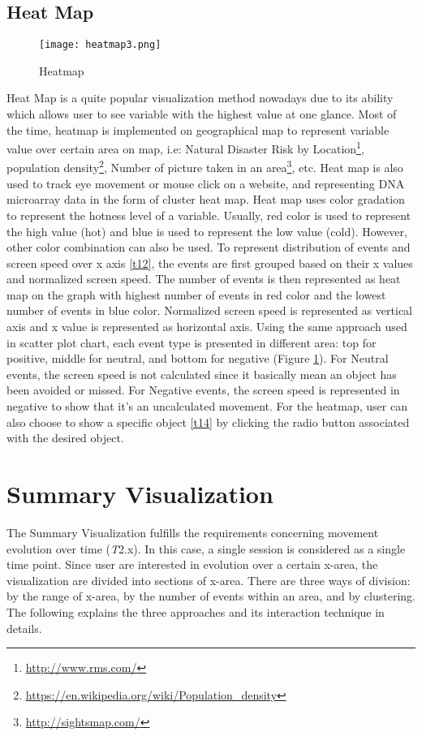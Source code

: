 \subsection{Heat Map}
\begin{figure}
\centering
\texttt{[image: heatmap3.png]}
\caption{Heatmap}
\label{heatmap}
\end{figure}
Heat Map is a quite popular visualization method nowadays due to its ability which allows user to see variable with the highest value at one glance. Most of the time, heatmap is implemented on geographical map to represent variable value over certain area on map, i.e: Natural Disaster Risk by Location\footnote{\url{http://www.rms.com/}}, population density\footnote{\url{https://en.wikipedia.org/wiki/Population_density}}, Number of picture taken in an area\footnote{\url{http://sightsmap.com/}}, etc. Heat map is also used to track eye movement or mouse click on a website, and representing DNA microarray data in the form of cluster heat map\cite{friendly}. Heat map uses color gradation to represent the hotness level of a variable. Usually, red color is used to represent the high value (hot) and blue is used to represent the low value (cold). However, other color combination can also be used. To represent distribution of events and screen speed over x axis \ref{t12}, the events are first grouped based on their x values and normalized screen speed. The number of events is then represented as heat map on the graph with highest number of events in red color and the lowest number of events in blue color. Normalized screen speed is represented as vertical axis and x value is represented as horizontal axis. Using the same approach used in scatter plot chart, each event type is presented in different area: top for positive, middle for neutral, and bottom for negative (Figure \ref{heatmap}). For Neutral events, the screen speed is not calculated since it basically mean an object has been avoided or missed. For Negative events, the screen speed is represented in negative to show that it's an uncalculated movement. For the heatmap, user can also choose to show a specific object \ref{t14} by clicking the radio button associated with the desired object.

\section{Summary Visualization}
The Summary Visualization fulfills the requirements concerning movement evolution over time (\textit{T}2.x). In this case, a single session is considered as a single time point. Since user are interested in evolution over a certain x-area, the visualization are divided into sections of x-area. There are three ways of division: by the range of x-area, by the number of events within an area, and by clustering. The following explains the three approaches and its interaction technique in details.


